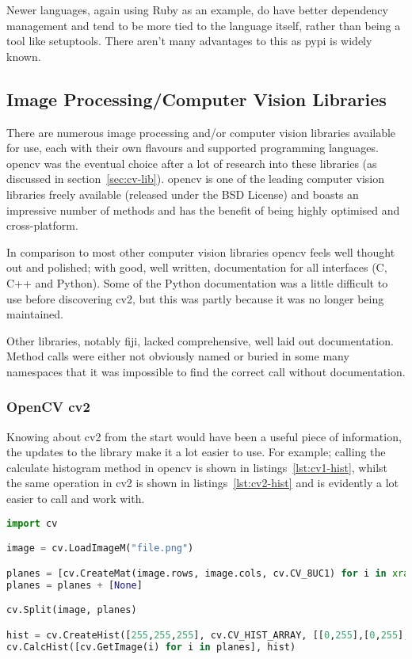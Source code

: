 Newer languages, again using Ruby as an example, do have better dependency management and tend to
be more tied to the language itself, rather than being a tool like setuptools. There aren't
many advantages to this as \gls{pypi} is widely known.


\subsection{Image Processing/Computer Vision Libraries}
There are numerous image processing and/or computer vision libraries available for use, each with
their own flavours and supported programming languages. \gls{opencv} was the eventual choice after a lot
of research into these libraries (as discussed in section~\ref{sec:cv-lib}). \gls{opencv} is one
of the leading computer vision libraries freely available (released under the BSD License) and 
boasts an impressive number of methods and has the benefit of being highly optimised and 
cross-platform.

In comparison to most other computer vision libraries \gls{opencv} feels well thought out and 
polished; with good, well written, documentation for all interfaces (C, C++ and Python). Some of
the Python documentation was a little difficult to use before discovering \gls{cv2}, but this was 
partly because it was no longer being maintained.

Other libraries, notably \gls{fiji}, lacked comprehensive, well laid out documentation. Method 
calls were either not obviously named or buried in some many namespaces that it was impossible to
find the correct call without documentation.


\subsubsection{OpenCV cv2}
Knowing about \gls{cv2} from the start would have been a useful piece of information, the
updates to the library make it a lot easier to use. For example; calling the calculate histogram
method in \gls{opencv} is shown in listings~\ref{lst:cv1-hist}, whilst the same operation in 
\gls{cv2} is shown in listings~\ref{lst:cv2-hist} and is evidently a lot easier to call
and work with.



\begin{lstlisting}[language=python, caption={Creating a Histogram in OpenCV}, label=lst:cv1-hist, 
breaklines=true, frame=single]
import cv

image = cv.LoadImageM("file.png")

planes = [cv.CreateMat(image.rows, image.cols, cv.CV_8UC1) for i in xrange(3)]
planes = planes + [None]

cv.Split(image, planes)

hist = cv.CreateHist([255,255,255], cv.CV_HIST_ARRAY, [[0,255],[0,255],[0,255]], 1)
cv.CalcHist([cv.GetImage(i) for i in planes], hist)
\end{lstlisting}



